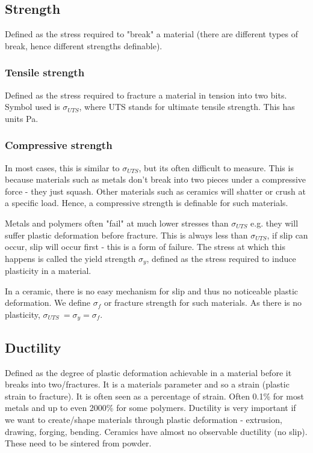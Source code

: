 \subsection{Strength}
Defined as the stress required to "break" a material (there are different types of break, hence different strengths definable).
\subsubsection{Tensile strength}
Defined as the stress required to fracture a material in tension into two bits. Symbol used is \(\sigma_{UTS}\), where UTS stands for ultimate tensile strength. This has units \si{\pascal}.
\subsubsection{Compressive strength}
In most cases, this is similar to \(\sigma_{UTS}\), but its often difficult to measure. This is because materials such as metals don't break into two pieces under a compressive force - they just squash. Other materials such as ceramics will shatter or crush at a specific load. Hence, a compressive strength is definable for such materials.

Metals and polymers often "fail" at much lower stresses than \(\sigma_{UTS}\) e.g. they will suffer plastic deformation before fracture. This is always less than \(\sigma_{UTS}\), if slip can occur, slip will occur first - this is a form of failure. The stress at which this happens is called the yield strength \(\sigma_y\), defined as the stress required to induce plasticity in a material.

In a ceramic, there is no easy mechanism for slip and thus no noticeable plastic deformation. We define \(\sigma_f\) or fracture strength for such materials. As there is no plasticity, \(\sigma_{UTS}\ = \sigma_y = \sigma_f\).
\subsection{Ductility}
Defined as the degree of plastic deformation achievable in a material before it breaks into two/fractures. It is a materials parameter and so a strain (plastic strain to fracture). It is often seen as a percentage of strain. Often 0.1\% for most metals and up to even 2000\% for some polymers. Ductility is very important if we want to create/shape materials through plastic deformation - extrusion, drawing, forging, bending. Ceramics have almost no observable ductility (no slip). These need to be sintered from powder.
